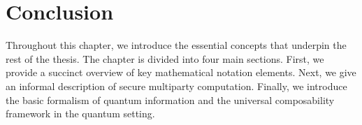 %    
%    


\section{Conclusion}

Throughout this chapter, we introduce the essential concepts that underpin the rest of the thesis. The chapter is divided into four main sections. First, we provide a succinct overview of key mathematical notation elements. Next, we give an informal description of secure multiparty computation. Finally, we introduce the basic formalism of quantum information and the universal composability framework in the quantum setting.


%
%
%
